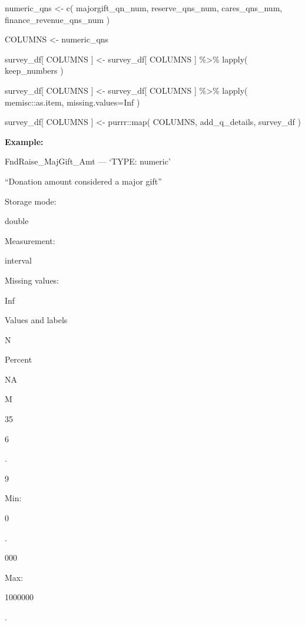 \documentclass[
  letterpaper,
]{scrbook}
\newenvironment{Shaded}{\begin{snugshade}}{\end{snugshade}}
\newcommand{\AttributeTok}[1]{\textcolor[rgb]{0.40,0.45,0.13}{#1}}
\newcommand{\ConstantTok}[1]{\textcolor[rgb]{0.56,0.35,0.01}{#1}}
\newcommand{\FunctionTok}[1]{\textcolor[rgb]{0.28,0.35,0.67}{#1}}
\newcommand{\NormalTok}[1]{\textcolor[rgb]{0.00,0.23,0.31}{#1}}
\newcommand{\OtherTok}[1]{\textcolor[rgb]{0.00,0.23,0.31}{#1}}
\newcommand{\SpecialCharTok}[1]{\textcolor[rgb]{0.37,0.37,0.37}{#1}}
\begin{document}
\begin{Shaded}
\begin{Highlighting}[]
\NormalTok{numeric\_qns }\OtherTok{\textless{}{-}} 
  \FunctionTok{c}\NormalTok{( majorgift\_qn\_num, }
\NormalTok{     reserve\_qns\_num, }
\NormalTok{     cares\_qns\_num, }
\NormalTok{     finance\_revenue\_qns\_num )}

\NormalTok{COLUMNS }\OtherTok{\textless{}{-}}\NormalTok{ numeric\_qns}

\NormalTok{survey\_df[ COLUMNS ] }\OtherTok{\textless{}{-}} 
\NormalTok{  survey\_df[ COLUMNS ] }\SpecialCharTok{\%\textgreater{}\%} 
  \FunctionTok{lapply}\NormalTok{( keep\_numbers )}

\NormalTok{survey\_df[ COLUMNS ] }\OtherTok{\textless{}{-}} 
\NormalTok{  survey\_df[ COLUMNS ] }\SpecialCharTok{\%\textgreater{}\%}
  \FunctionTok{lapply}\NormalTok{( memisc}\SpecialCharTok{::}\NormalTok{as.item, }\AttributeTok{missing.values=}\ConstantTok{Inf}\NormalTok{ )}

\NormalTok{survey\_df[ COLUMNS ] }\OtherTok{\textless{}{-}}\NormalTok{ purrr}\SpecialCharTok{::}\FunctionTok{map}\NormalTok{( COLUMNS, add\_q\_details, survey\_df )}
\end{Highlighting}
\end{Shaded}

\textbf{Example:}

FndRaise\_MajGift\_Amt --- {`TYPE: numeric'}

``Donation amount considered a major gift''

Storage mode:

double

Measurement:

interval

Missing values:

Inf

Values and labels

N

Percent

NA

M

35

6

.

9

Min:

0

.

000

Max:

1000000

.
\end{document}
